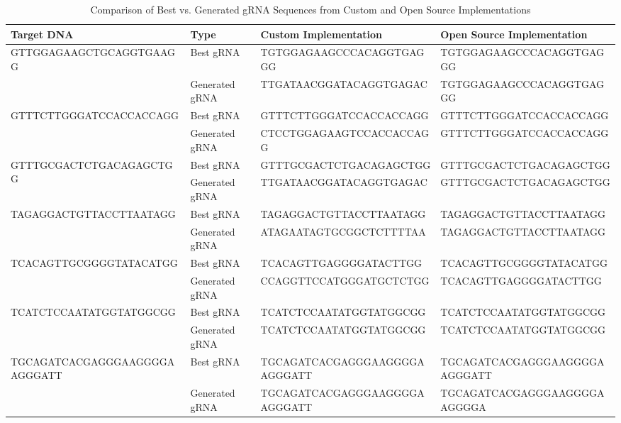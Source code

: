 \documentclass{article}
\begin{document}
\begin{table}[H]
\tiny
\renewcommand{\arraystretch}{1.7}
\hspace*{-0.8cm}
\centering
\begin{tabular}{|p{4.1cm}|p{1.6cm}|p{4.1cm}|p{4.1cm}|}
\hline
\textbf{Target DNA} & \textbf{Type} & \textbf{Custom Implementation} & \textbf{Open Source Implementation} \\
\hline
\multirow{2}{4.7cm}{GTTGGAGAAGCTGCAGGTGAAGG} 
& Best gRNA & TGTGGAGAAGCCCACAGGTGAGGG & TGTGGAGAAGCCCACAGGTGAGGG \\
& Generated gRNA & TTGATAACGGATACAGGTGAGAC & TGTGGAGAAGCCCACAGGTGAGGG \\
\hline
\multirow{2}{4.7cm}{GTTTCTTGGGATCCACCACCAGG} 
& Best gRNA & GTTTCTTGGGATCCACCACCAGG & GTTTCTTGGGATCCACCACCAGG \\
& Generated gRNA & CTCCTGGAGAAGTCCACCACCAGG & GTTTCTTGGGATCCACCACCAGG \\
\hline
\multirow{2}{4.7cm}{GTTTGCGACTCTGACAGAGCTGG} 
& Best gRNA & GTTTGCGACTCTGACAGAGCTGG & GTTTGCGACTCTGACAGAGCTGG \\
& Generated gRNA & TTGATAACGGATACAGGTGAGAC & GTTTGCGACTCTGACAGAGCTGG \\
\hline
\multirow{2}{4.7cm}{TAGAGGACTGTTACCTTAATAGG} 
& Best gRNA & TAGAGGACTGTTACCTTAATAGG & TAGAGGACTGTTACCTTAATAGG \\
& Generated gRNA & ATAGAATAGTGCGGCTCTTTTAA & TAGAGGACTGTTACCTTAATAGG \\
\hline
\multirow{2}{4.7cm}{TCACAGTTGCGGGGTATACATGG} 
& Best gRNA & TCACAGTTGAGGGGATACTTGG & TCACAGTTGCGGGGTATACATGG \\
& Generated gRNA & CCAGGTTCCATGGGATGCTCTGG & TCACAGTTGAGGGGATACTTGG \\
\hline
\multirow{2}{4.7cm}{TCATCTCCAATATGGTATGGCGG} 
& Best gRNA & TCATCTCCAATATGGTATGGCGG & TCATCTCCAATATGGTATGGCGG \\
& Generated gRNA & TCATCTCCAATATGGTATGGCGG & TCATCTCCAATATGGTATGGCGG \\
\hline
\multirow{2}{4.7cm}{TGCAGATCACGAGGGAAGGGGAAGGGATT} 
& Best gRNA & TGCAGATCACGAGGGAAGGGGAAGGGATT & TGCAGATCACGAGGGAAGGGGAAGGGATT \\
& Generated gRNA & TGCAGATCACGAGGGAAGGGGAAGGGATT & TGCAGATCACGAGGGAAGGGGAAGGGGA \\
\hline
\end{tabular}
\vspace{0.2 cm}
\caption{Comparison of Best vs. Generated gRNA Sequences from Custom and Open Source Implementations}
\end{table}
\end{document}
